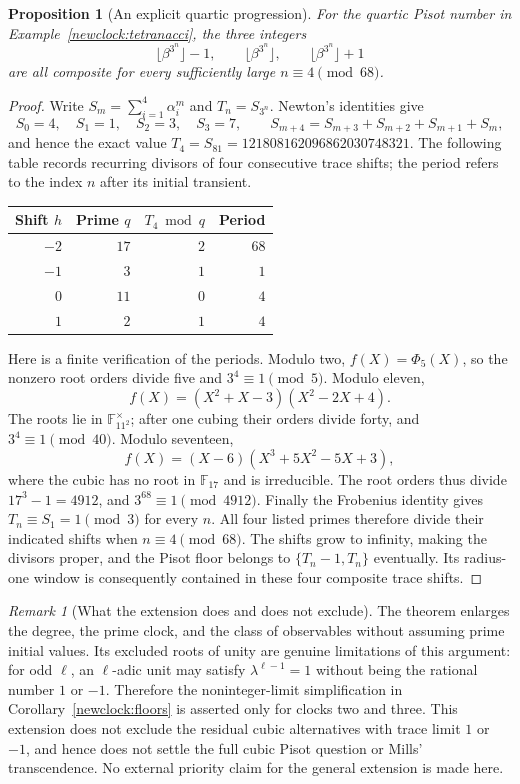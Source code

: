 \documentclass[11pt,a4paper]{article}
\newtheorem{proposition}[theorem]{Proposition}
\theoremstyle{definition}\newtheorem{definition}[theorem]{Definition}
\theoremstyle{remark}\newtheorem{remark}[theorem]{Remark}
\begin{document}
\begin{proposition}[An explicit quartic progression]
\label{newclock:tetranacci-explicit}
For the quartic Pisot number in Example~\ref{newclock:tetranacci},
the three integers
\[
 \lfloor\beta^{3^n}\rfloor-1,\qquad
 \lfloor\beta^{3^n}\rfloor,\qquad
 \lfloor\beta^{3^n}\rfloor+1
\]
are all composite for every sufficiently large
$n\equiv4\pmod{68}$.
\end{proposition}
\begin{proof}
Write $S_m=\sum_{i=1}^4\alpha_i^m$ and $T_n=S_{3^n}$.
Newton's identities give
\[
 S_0=4,\quad S_1=1,\quad S_2=3,\quad S_3=7,\qquad
 S_{m+4}=S_{m+3}+S_{m+2}+S_{m+1}+S_m,
\]
and hence the exact value
$T_4=S_{81}=121808162096862030748321$.
The following table records recurring divisors of four consecutive
trace shifts; the period refers to the index $n$ after its initial
transient.
\begin{center}
\begin{tabular}{rrrr}
\toprule
Shift $h$ & Prime $q$ & $T_4\bmod q$ & Period\\
\midrule
$-2$ & $17$ & $2$ & $68$\\
$-1$ & $3$ & $1$ & $1$\\
$0$ & $11$ & $0$ & $4$\\
$1$ & $2$ & $1$ & $4$\\
\bottomrule
\end{tabular}
\end{center}
Here is a finite verification of the periods. Modulo two,
$f(X)=\Phi_5(X)$, so the nonzero root orders divide five
and $3^4\equiv1\pmod5$. Modulo eleven,
\[
 f(X)=(X^2+X-3)(X^2-2X+4).
\]
The roots lie in $\mathbb F_{11^2}^\times$; after one cubing
their orders divide forty, and $3^4\equiv1\pmod{40}$.
Modulo seventeen,
\[
 f(X)=(X-6)(X^3+5X^2-5X+3),
\]
where the cubic has no root in $\mathbb F_{17}$ and is
irreducible.  The root orders thus divide $17^3-1=4912$,
and $3^{68}\equiv1\pmod{4912}$.  Finally the Frobenius
identity gives $T_n\equiv S_1=1\pmod3$ for every $n$.
All four listed primes therefore divide their indicated
shifts when $n\equiv4\pmod{68}$.  The shifts grow to
infinity, making the divisors proper, and the Pisot floor
belongs to $\{T_n-1,T_n\}$ eventually.  Its radius-one
window is consequently contained in these four composite
trace shifts.
\end{proof}

\begin{remark}[What the extension does and does not exclude]
The theorem enlarges the degree, the prime clock, and the
class of observables without assuming prime initial values.
Its excluded roots of unity are genuine limitations of
this argument: for odd $\ell$, an $\ell$-adic unit may
satisfy $\lambda^{\ell-1}=1$ without being the rational
number $1$ or $-1$.  Therefore the noninteger-limit
simplification in Corollary~\ref{newclock:floors} is
asserted only for clocks two and three.  This extension
does not exclude the residual cubic alternatives with
trace limit $1$ or $-1$, and hence does not settle the
full cubic Pisot question or Mills' transcendence.
No external priority claim for the general extension is
made here.
\end{remark}
\end{document}
